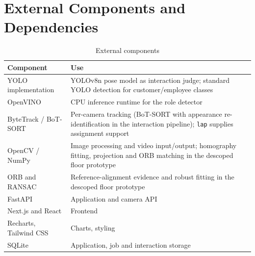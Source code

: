 \section{External Components and Dependencies}
\begin{table}[H]
\centering
\caption{External components}
\begin{tabular}{P{0.25\textwidth}P{0.62\textwidth}}
\toprule
Component & Use\\
\midrule
YOLO implementation \cite{ultralytics} & YOLOv8n pose model as interaction judge; standard YOLO detection for customer/employee classes\\
OpenVINO & CPU inference runtime for the role detector\\
ByteTrack \cite{zhang2022bytetrack} / BoT-SORT & Per-camera tracking (BoT-SORT with appearance re-identification in the interaction pipeline); \texttt{lap} supplies assignment support\\
OpenCV / NumPy \cite{opencvHomography} & Image processing and video input/output; homography fitting, projection and ORB matching in the descoped floor prototype\\
ORB \cite{rublee2011orb} and RANSAC \cite{fischler1981ransac} & Reference-alignment evidence and robust fitting in the descoped floor prototype\\
FastAPI \cite{fastapi} & Application and camera API\\
Next.js and React \cite{nextjs} & Frontend\\
Recharts, Tailwind CSS & Charts, styling\\
SQLite & Application, job and interaction storage\\
\bottomrule
\end{tabular}
\end{table}

